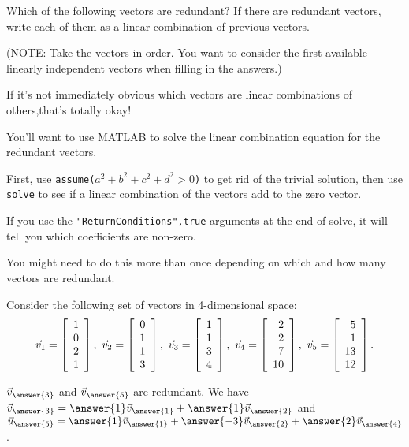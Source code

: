 \documentclass{ximera}
\author{Zack Reed}
\begin{document}
\begin{exercise}

    Which of the following vectors are redundant? If there are redundant
vectors, write each of them as a linear combination of previous
vectors.

(NOTE: Take the vectors in order. You want to consider the first available linearly independent vectors when filling in the answers.)

\begin{hint}

    If it's not immediately obvious which vectors are linear combinations of others,that's totally okay! 

    You'll want to use MATLAB to solve the linear combination equation for the redundant vectors.

    First, use \texttt{assume($a^2+b^2+c^2+d^2>0$)} to get rid of the trivial solution, then use \texttt{solve} to see if a linear combination of the vectors add to the zero vector.

    If you use the \texttt{"ReturnConditions",true} arguments at the end of solve, it will tell you which coefficients are non-zero. 

    You might need to do this more than once depending on which and how many vectors are redundant.

\end{hint}
Consider the following set of vectors in 4-dimensional space:
\[
\vect{v}_1 = \startmat{r} 1 \\ 0 \\ 2 \\ 1 \stopmat,\quad
\vect{v}_2 = \startmat{r} 0 \\ 1 \\ 1 \\ 3 \stopmat,\quad
\vect{v}_3 = \startmat{r} 1 \\ 1 \\ 3 \\ 4 \stopmat,\quad
\vect{v}_4 = \startmat{r} 2 \\ 2 \\ 7 \\ 10 \stopmat,\quad
\vect{v}_5 = \startmat{r} 5 \\ 1 \\ 13 \\ 12 \stopmat.
\]



$\vect{v}_{\answer{3}}$ and $\vect{v}_{\answer{5}}$ are redundant. We have
$\vect{v}_{\answer{3}}=\answer{1}\vect{v}_{\answer{1}}+\answer{1}\vect{v}_{\answer{2}}$ and $\vect{u}_{\answer{5}}=\answer{1}\vect{v}_{\answer{1}}+\answer{-3}\vect{v}_{\answer{2}}+\answer{2}\vect{v}_{\answer{4}}$.


\end{exercise}
\end{document}
